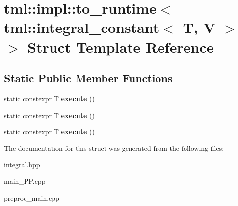 \hypertarget{structtml_1_1impl_1_1to__runtime_3_01tml_1_1integral__constant_3_01T_00_01V_01_4_01_4}{\section{tml\+:\+:impl\+:\+:to\+\_\+runtime$<$ tml\+:\+:integral\+\_\+constant$<$ T, V $>$ $>$ Struct Template Reference}
\label{structtml_1_1impl_1_1to__runtime_3_01tml_1_1integral__constant_3_01T_00_01V_01_4_01_4}
}
\subsection*{Static Public Member Functions}
\begin{DoxyCompactItemize}
\item 
\hypertarget{structtml_1_1impl_1_1to__runtime_3_01tml_1_1integral__constant_3_01T_00_01V_01_4_01_4_afe3bf341c476a42f4a31f87da486bb54}{static constexpr T {\bfseries execute} ()}\label{structtml_1_1impl_1_1to__runtime_3_01tml_1_1integral__constant_3_01T_00_01V_01_4_01_4_afe3bf341c476a42f4a31f87da486bb54}

\item 
\hypertarget{structtml_1_1impl_1_1to__runtime_3_01tml_1_1integral__constant_3_01T_00_01V_01_4_01_4_afe3bf341c476a42f4a31f87da486bb54}{static constexpr T {\bfseries execute} ()}\label{structtml_1_1impl_1_1to__runtime_3_01tml_1_1integral__constant_3_01T_00_01V_01_4_01_4_afe3bf341c476a42f4a31f87da486bb54}

\item 
\hypertarget{structtml_1_1impl_1_1to__runtime_3_01tml_1_1integral__constant_3_01T_00_01V_01_4_01_4_afe3bf341c476a42f4a31f87da486bb54}{static constexpr T {\bfseries execute} ()}\label{structtml_1_1impl_1_1to__runtime_3_01tml_1_1integral__constant_3_01T_00_01V_01_4_01_4_afe3bf341c476a42f4a31f87da486bb54}

\end{DoxyCompactItemize}


The documentation for this struct was generated from the following files\+:\begin{DoxyCompactItemize}
\item 
integral.\+hpp\item 
main\+\_\+\+P\+P.\+cpp\item 
preproc\+\_\+main.\+cpp\end{DoxyCompactItemize}
